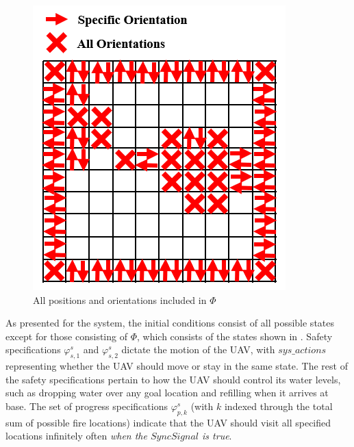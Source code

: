 \documentclass[journal]{IEEEtran}
\begin{document}
 \begin{figure}
	\includegraphics[width = 0.8 \linewidth]{Phi}
	\centering
	\caption{All positions and orientations included in $\Phi$}
	\label{Phi}
\end{figure}

As presented for the system, the initial conditions consist of all possible states except for those consisting of $\Phi$, which consists of the states shown in \label{Phi}. Safety specifications $\varphi_{s,1}^{s}$ and $\varphi_{s,2}^{s}$ dictate the motion of the UAV, with $sys\_actions$ representing whether the UAV should move or stay in the same state. The rest of the safety specifications pertain to how the UAV should control its water levels, such as dropping water over any goal location and refilling when it arrives at base. The set of progress specifications $\varphi_{p,k}^{s}$ (with $k$ indexed through the total sum of possible fire locations) indicate that the UAV should visit all specified locations infinitely often \textit{when the $SyncSignal$ is true}. 

\end{document}
